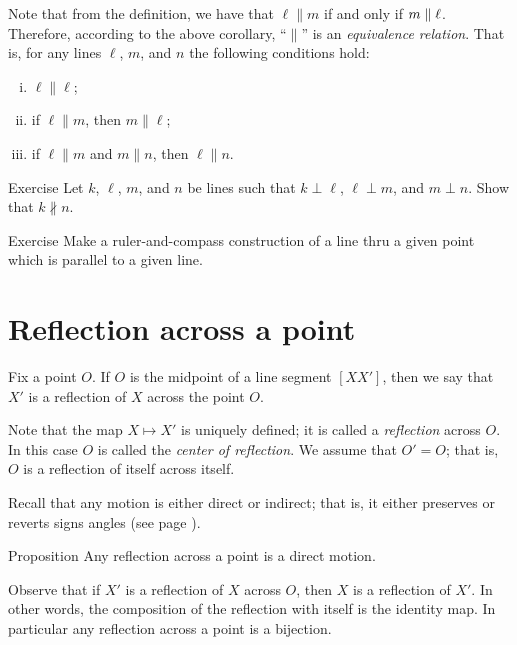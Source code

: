 Note that from the definition, we have that $\ell\parallel m$ if and only if $m\z\parallel \ell$.
Therefore, according to the above corollary, ``$\parallel$'' is an 
\emph{equivalence relation}.
That is, for any lines $\ell$, $m$, and $n$ the following conditions hold:
\begin{enumerate}[(i)]
\item $\ell\parallel \ell$;
\item if $\ell\parallel m$, then $m\parallel \ell$;
\item if $\ell\parallel m$ and $m\parallel n$, then 
$\ell\parallel n$.
\end{enumerate}

\begin{thm}{Exercise}\label{ex:perp-perp}
Let $k$, $\ell$, $m$, and $n$ be lines such that $k\perp \ell$, $\ell\perp m$, and $m\perp n$.
Show that $k\nparallel n$.
\end{thm}

\begin{thm}{Exercise}\label{ex:construction-parallel}
Make a ruler-and-compass construction of a line thru a given point which is parallel to a given line.
\end{thm}

\section*{Reflection across a point}

Fix a point $O$.
If $O$ is the midpoint of a line segment $[XX']$, then we say that $X'$ is a reflection of $X$ across the point $O$.

Note that the map $X\mapsto X'$ is uniquely defined; it is called a \emph{reflection} across $O$.
In this case $O$ is called the \emph{center of reflection}. 
We assume that $O'=O$; that is, $O$ is a reflection of itself across itself.

Recall that any motion is either direct or indirect;
that is, it either preserves or reverts signs angles (see page \pageref{direct motion}). 

\begin{thm}[\abs]{Proposition}\label{prop:point-reflection}
Any reflection across a point is a direct motion.
\end{thm}


Observe that if $X'$ is a reflection of $X$ across $O$, 
then $X$ is a reflection of $X'$.
In other words, the composition of the reflection with itself is the identity map.
In particular any reflection across a point is a bijection.

